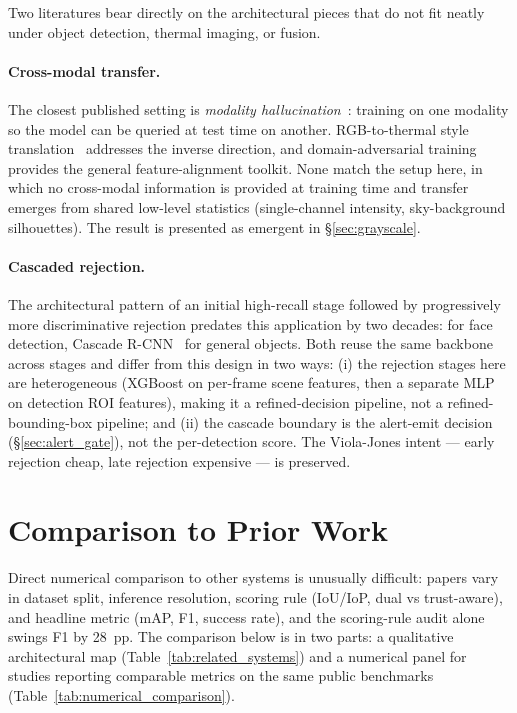 Two literatures bear directly on the architectural pieces that do not fit neatly under object detection, thermal imaging, or fusion.

\paragraph{Cross-modal transfer.}
The closest published setting is \emph{modality hallucination}~\cite{hoffman2016modalityhallucination}: training on one modality so the model can be queried at test time on another. RGB-to-thermal style translation~\cite{berg2018rgb2thermal,kniaz2018thermalgan} addresses the inverse direction, and domain-adversarial training~\cite{ganin2016domain} provides the general feature-alignment toolkit. None match the setup here, in which no cross-modal information is provided at training time and transfer emerges from shared low-level statistics (single-channel intensity, sky-background silhouettes). The result is presented as emergent in \S\ref{sec:grayscale}.

\paragraph{Cascaded rejection.}
The architectural pattern of an initial high-recall stage followed by progressively more discriminative rejection predates this application by two decades: \citet{viola2001rapid} for face detection, Cascade R-CNN~\cite{cai2018cascade} for general objects. Both reuse the same backbone across stages and differ from this design in two ways: (i) the rejection stages here are heterogeneous (XGBoost on per-frame scene features, then a separate MLP on detection ROI features), making it a refined-decision pipeline, not a refined-bounding-box pipeline; and (ii) the cascade boundary is the alert-emit decision (\S\ref{sec:alert_gate}), not the per-detection score. The Viola-Jones intent --- early rejection cheap, late rejection expensive --- is preserved.

\section{Comparison to Prior Work}
\label{sec:comparison}

Direct numerical comparison to other systems is unusually difficult: papers vary in dataset split, inference resolution, scoring rule (IoU/IoP, dual vs trust-aware), and headline metric (mAP, F1, success rate), and the scoring-rule audit alone swings F1 by 28~pp. The comparison below is in two parts: a qualitative architectural map (Table~\ref{tab:related_systems}) and a numerical panel for studies reporting comparable metrics on the same public benchmarks (Table~\ref{tab:numerical_comparison}).


